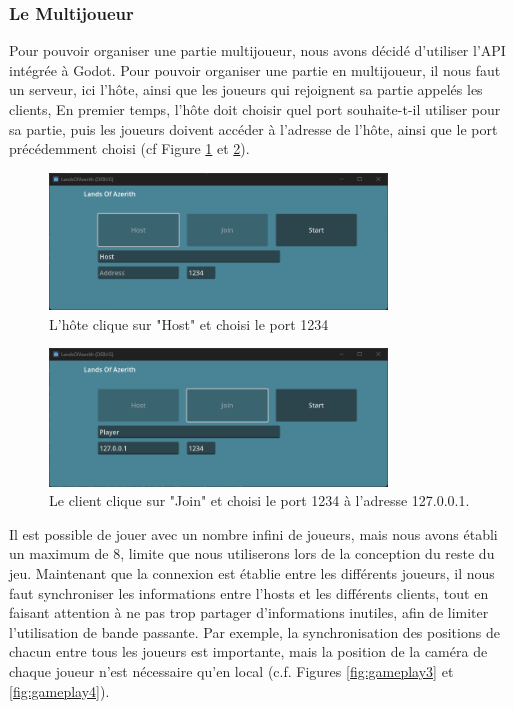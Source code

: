 
\subsubsection*{Le Multijoueur}

Pour pouvoir organiser une partie multijoueur, nous avons décidé d'utiliser l'API intégrée à Godot.
Pour pouvoir organiser une partie en multijoueur, il nous faut un serveur, ici l'hôte, ainsi que les joueurs qui rejoignent sa partie appelés les clients,
En premier temps, l'hôte doit choisir quel port souhaite-t-il utiliser pour sa partie, puis les joueurs doivent accéder à l'adresse de l'hôte, ainsi que le port précédemment choisi (cf Figure \ref{fig:gameplay1} et \ref*{fig:gameplay2}).

\begin{figure}[H]
    \centering
    \includegraphics[width=0.8\textwidth]{2.game/assets/gameplay1.png}
    \caption{L'hôte clique sur "Host" et choisi le port 1234}
    \label{fig:gameplay1}
\end{figure}

\begin{figure}[H]
    \centering
    \includegraphics[width=0.8\textwidth]{2.game/assets/gameplay2.png}
    \caption{Le client clique sur "Join" et choisi le port 1234 à l'adresse 127.0.0.1.}
    \label{fig:gameplay2}
\end{figure}

Il est possible de jouer avec un nombre infini de joueurs, mais nous avons établi un maximum de 8, limite que nous utiliserons lors de la conception du reste du jeu.
Maintenant que la connexion est établie entre les différents joueurs, il nous faut synchroniser les informations entre l'hosts et les différents clients, tout en faisant attention à ne pas trop partager d'informations inutiles, afin de limiter l'utilisation de bande passante.
Par exemple, la synchronisation des positions de chacun entre tous les joueurs est importante, mais la position de la caméra de chaque joueur n'est nécessaire qu'en local (c.f. Figures \ref*{fig:gameplay3} et \ref*{fig:gameplay4}).

